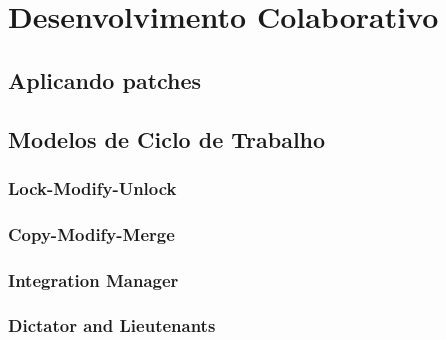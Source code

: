 \chapter{Desenvolvimento Colaborativo}
\section{Aplicando patches}
\section{Modelos de Ciclo de Trabalho}
\subsection{Lock-Modify-Unlock}
\subsection{Copy-Modify-Merge}
\subsection{Integration Manager}
\subsection{Dictator and Lieutenants}
